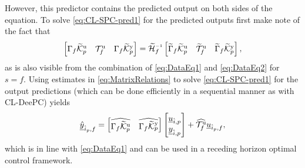 However, this predictor contains the predicted output on both sides of the equation. To solve \eqref{eq:CL-SPC-pred1} for the predicted outputs first make note of the fact that~\citep{Houtzager2012}
\begin{align}\label{eq:MatrixRelations}
	\begin{bmatrix}
		\Gamma_f\tKp{u} & \mathcal{T}_f^\mathrm{u} & \Gamma_f\tKp{y}
	\end{bmatrix}=
        \tHf\inv\begin{bmatrix}
		\widetilde{\Gamma}_f\tKp{u} & \widetilde{\mathcal{T}}_f^\mathrm{u} & \widetilde{\Gamma}_f\tKp{y}
	\end{bmatrix},
\end{align}
as is also visible from the combination of \eqref{eq:DataEq1} and \eqref{eq:DataEq2} for $s=f$. Using estimates in \eqref{eq:MatrixRelations} to solve \eqref{eq:CL-SPC-pred1} for the output predictions (which can be done efficiently in a sequential manner as with \ac{CL-DeePC}) yields
\begin{align}\label{eq:CL-SPC-pred2}
		\underline{\hat{y}}_{\hat{i}_p,f}= \begin{bmatrix}\widehat{\Gamma_f\widetilde{\mathcal{K}}_{p}^{\mathrm{{u}}}} & \widehat{\Gamma_f\widetilde{\mathcal{K}}_{p}^{\mathrm{{y}}}} \end{bmatrix} 
		\begin{bmatrix}
			\underline{u}_{\hat{i},p}\\
			\underline{y}_{\hat{i},p}
		\end{bmatrix}+
		\widehat{\mathcal{T}_f^\mathrm{u}} 
		\underline{u}_{\hat{i}_p,f},
\end{align}
which is in line with \eqref{eq:DataEq1} and can be used in a receding horizon optimal control framework.

